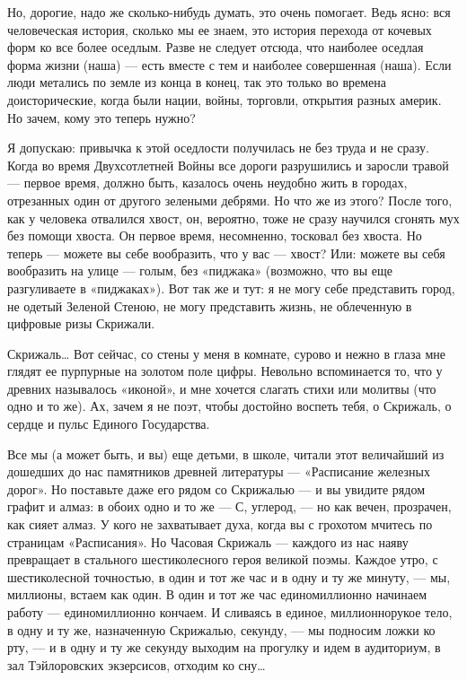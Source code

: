 \documentclass[11pt,openany]{book}
\begin{document}
Но, дорогие, надо же сколько-нибудь думать, это очень помогает. Ведь ясно: вся человеческая история, сколько мы ее знаем, это история перехода от кочевых форм ко все более оседлым. Разве не следует отсюда, что наиболее оседлая форма жизни (наша) --- есть вместе с тем и наиболее совершенная (наша). Если люди метались по земле из конца в конец, так это только во времена доисторические, когда были нации, войны, торговли, открытия разных америк. Но зачем, кому это теперь нужно?

Я допускаю: привычка к этой оседлости получилась не без труда и не сразу. Когда во время Двухсотлетней Войны все дороги разрушились и заросли травой --- первое время, должно быть, казалось очень неудобно жить в городах, отрезанных один от другого зелеными дебрями. Но что же из этого? После того, как у человека отвалился хвост, он, вероятно, тоже не сразу научился сгонять мух без помощи хвоста. Он первое время, несомненно, тосковал без хвоста. Но теперь --- можете вы себе вообразить, что у вас --- хвост? Или: можете вы себя вообразить на улице --- голым, без «пиджака» (возможно, что вы еще разгуливаете в «пиджаках»). Вот так же и тут: я не могу себе представить город, не одетый Зеленой Стеною, не могу представить жизнь, не облеченную в цифровые ризы Скрижали.

Скрижаль\ldots{} Вот сейчас, со стены у меня в комнате, сурово и нежно в глаза мне глядят ее пурпурные на золотом поле цифры. Невольно вспоминается то, что у древних называлось «иконой», и мне хочется слагать стихи или молитвы (что одно и то же). Ах, зачем я не поэт, чтобы достойно воспеть тебя, о Скрижаль, о сердце и пульс Единого Государства.

Все мы (а может быть, и вы) еще детьми, в школе, читали этот величайший из дошедших до нас памятников древней литературы --- «Расписание железных дорог». Но поставьте даже его рядом со Скрижалью --- и вы увидите рядом графит и алмаз: в обоих одно и то же --- С, углерод, --- но как вечен, прозрачен, как сияет алмаз. У кого не захватывает духа, когда вы с грохотом мчитесь по страницам «Расписания». Но Часовая Скрижаль --- каждого из нас наяву превращает в стального шестиколесного героя великой поэмы. Каждое утро, с шестиколесной точностью, в один и тот же час и в одну и ту же минуту, --- мы, миллионы, встаем как один. В один и тот же час единомиллионно начинаем работу --- единомиллионно кончаем. И сливаясь в единое, миллионнорукое тело, в одну и ту же, назначенную Скрижалью, секунду, --- мы подносим ложки ко рту, --- и в одну и ту же секунду выходим на прогулку и идем в аудиториум, в зал Тэйлоровских экзерсисов, отходим ко сну\ldots{}
\end{document}
